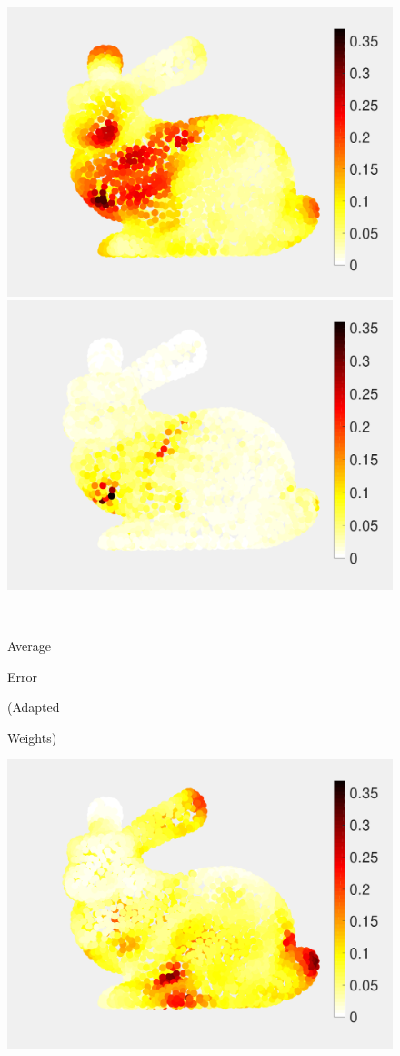 \documentclass[journal, 10pt]{IEEEtran}
\begin{document}
\begin{figure}[H]
\begin{minipage}[m]{0.4\linewidth}
\centerline{\includegraphics[width=.85\linewidth]{fig_rec_low_error}}
\end{minipage}
\begin{minipage}[m]{0.4\linewidth}
\centerline{\includegraphics[width=.85\linewidth]{fig_rec_band_error}}
\end{minipage} \\
\begin{minipage}[m]{0.16\linewidth}
\centerline{\small{Average}}
\centerline{\small{Error}}
\centerline{\small{(Adapted}}
\centerline{\small{Weights)}}
\end{minipage}
\begin{minipage}[m]{0.4\linewidth}
\centerline{\includegraphics[width=.85\linewidth]{fig_rec_low_error_adapted}}

\end{minipage}
\end{figure}
\end{document}
